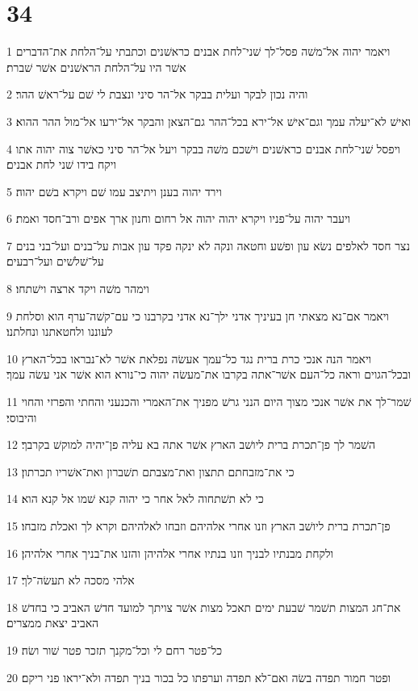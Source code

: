 \chapter{34}

\par 1 ויאמר יהוה אל־משׁה פסל־לך שׁני־לחת אבנים כראשׁנים וכתבתי על־הלחת את־הדברים אשׁר היו על־הלחת הראשׁנים אשׁר שׁברת׃
\par 2 והיה נכון לבקר ועלית בבקר אל־הר סיני ונצבת לי שׁם על־ראשׁ ההר׃
\par 3 ואישׁ לא־יעלה עמך וגם־אישׁ אל־ירא בכל־ההר גם־הצאן והבקר אל־ירעו אל־מול ההר ההוא׃
\par 4 ויפסל שׁני־לחת אבנים כראשׁנים וישׁכם משׁה בבקר ויעל אל־הר סיני כאשׁר צוה יהוה אתו ויקח בידו שׁני לחת אבנים׃
\par 5 וירד יהוה בענן ויתיצב עמו שׁם ויקרא בשׁם יהוה׃
\par 6 ויעבר יהוה על־פניו ויקרא יהוה יהוה אל רחום וחנון ארך אפים ורב־חסד ואמת׃
\par 7 נצר חסד לאלפים נשׂא עון ופשׁע וחטאה ונקה לא ינקה פקד עון אבות על־בנים ועל־בני בנים על־שׁלשׁים ועל־רבעים׃
\par 8 וימהר משׁה ויקד ארצה וישׁתחו׃
\par 9 ויאמר אם־נא מצאתי חן בעיניך אדני ילך־נא אדני בקרבנו כי עם־קשׁה־ערף הוא וסלחת לעוננו ולחטאתנו ונחלתנו׃
\par 10 ויאמר הנה אנכי כרת ברית נגד כל־עמך אעשׂה נפלאת אשׁר לא־נבראו בכל־הארץ ובכל־הגוים וראה כל־העם אשׁר־אתה בקרבו את־מעשׂה יהוה כי־נורא הוא אשׁר אני עשׂה עמך׃
\par 11 שׁמר־לך את אשׁר אנכי מצוך היום הנני גרשׁ מפניך את־האמרי והכנעני והחתי והפרזי והחוי והיבוסי׃
\par 12 השׁמר לך פן־תכרת ברית ליושׁב הארץ אשׁר אתה בא עליה פן־יהיה למוקשׁ בקרבך׃
\par 13 כי את־מזבחתם תתצון ואת־מצבתם תשׁברון ואת־אשׁריו תכרתון׃
\par 14 כי לא תשׁתחוה לאל אחר כי יהוה קנא שׁמו אל קנא הוא׃
\par 15 פן־תכרת ברית ליושׁב הארץ וזנו אחרי אלהיהם וזבחו לאלהיהם וקרא לך ואכלת מזבחו׃
\par 16 ולקחת מבנתיו לבניך וזנו בנתיו אחרי אלהיהן והזנו את־בניך אחרי אלהיהן׃
\par 17 אלהי מסכה לא תעשׂה־לך׃
\par 18 את־חג המצות תשׁמר שׁבעת ימים תאכל מצות אשׁר צויתך למועד חדשׁ האביב כי בחדשׁ האביב יצאת ממצרים׃
\par 19 כל־פטר רחם לי וכל־מקנך תזכר פטר שׁור ושׂה׃
\par 20 ופטר חמור תפדה בשׂה ואם־לא תפדה וערפתו כל בכור בניך תפדה ולא־יראו פני ריקם׃
